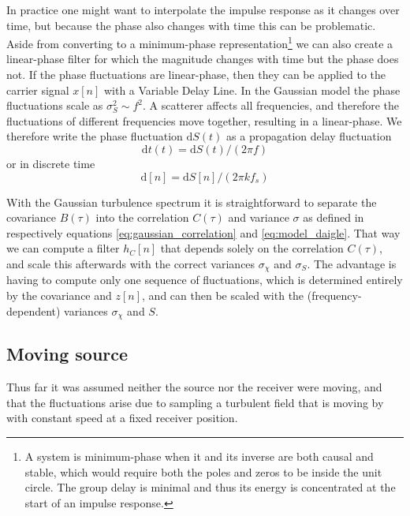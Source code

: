 In practice one might want to interpolate the impulse response as it changes
over time, but because the phase also changes with time this can be problematic.
Aside from converting to a minimum-phase representation\footnote{
A system is minimum-phase when it and its inverse are both causal and stable, which would require both the poles and zeros to be inside the unit circle.
The group delay is minimal and thus its energy is concentrated at the start of an impulse response.} we can also create a
linear-phase filter for which the magnitude changes with time but the phase does
not. If the phase fluctuations are linear-phase, then they can be applied to the
carrier signal $x[n]$ with a Variable Delay Line. In the Gaussian model the
phase fluctuations scale as $\sigma_S^2 \sim f^2$. A scatterer affects all frequencies, and therefore the fluctuations of different frequencies move together, resulting in a linear-phase.
We therefore write the phase fluctuation $\mathrm{d}S(t)$ as a propagation delay fluctuation
\begin{equation}\label{eq:time_delay_fluctuations}
\mathrm{d}t(t) = \mathrm{d}S(t) / (2 \pi f)
\end{equation}
or in discrete time
\begin{equation}
 \mathrm{d}[n] = \mathrm{d}S[n] / (2 \pi k f_s)
\end{equation}

With the Gaussian turbulence spectrum it is straightforward to separate the
covariance $B(\tau)$ into the correlation $C(\tau)$ and variance $\sigma$ as defined in respectively equations \eqref{eq:gaussian_correlation} and \eqref{eq:model_daigle}. That
way we can compute a filter $h_C[n]$ that depends solely on the correlation
$C(\tau)$, and scale this afterwards with the correct variances $\sigma_{\chi}$
and $\sigma_{S}$. The advantage is having to compute only one sequence of
fluctuations, which is determined entirely by the covariance and $z[n]$, and can
then be scaled with the (frequency-dependent) variances $\sigma_{\chi}$ and
$S$.

\subsection{Moving source}
Thus far it was assumed neither the source nor the receiver were moving, and
that the fluctuations arise due to sampling a turbulent field that is moving
by with constant speed at a fixed receiver position.

